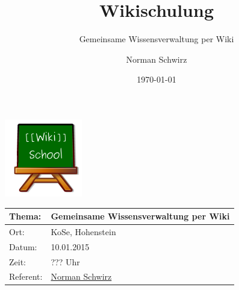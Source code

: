 \documentclass{beamer}              %
\title{Wikischulung}
\subtitle{Gemeinsame Wissensverwaltung per Wiki}
\author{Norman Schwirz}
\institute{StuRa der HTW Dresden, Bereich Schulungen}
\date{\today}
\begin{document}

\begin{frame} %
  \begin{center}
    \includegraphics[keepaspectratio=true, scale=1]{wikischool-logo}
    \begin{longtable}{|l|l|}
      \hline
        
       \textbf{Thema:}        &  \textbf{Gemeinsame Wissensverwaltung per Wiki}                  \\ 
      \hline       
       Ort:                   &  KoSe, Hohenstein                                                \\ 
      \hline       
       Datum:                 &  10.01.2015                                                      \\
      \hline       
       Zeit:                  &  ??? Uhr                                               \\ 
      \hline       
       Referent:              &  \href{http://www.stura.htw-dresden.de/members/NormanSchwirz}{Norman Schwirz}  \\ 
      \hline       
    \end{longtable}
  \end{center}
\end{frame}
\end{document}

